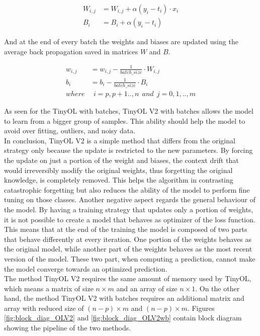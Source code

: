\documentclass[12pt]{report}
\begin{document}
\begin{align}
    W_{i,j} &= W_{i,j} + \alpha (y_i - t_i) \cdot x_i \\
    B_i     &= B_i + \alpha  (y_i - t_i) 
\end{align}

And at the end of every batch the weights and biases are updated using the average back propagation saved in matrices $W$ and $B$.

\begin{align}
    w_{i,j} &= w_{i,j} - \frac{1}{batch\_size} \cdot W_{i,j} \\
    b_i 	    &= b_i - \frac{1}{batch\_size} \cdot B_i \\
    where   & \: \: i= p,p+1..,n  \: \: and \: \:  j=0,1,..,m \nonumber  
\end{align}

As seen for the TinyOL with batches, TinyOL V2 with batches allows the model to learn from a bigger group of samples. This ability should help the model to avoid over fitting, outliers, and noisy data. \\
In conclusion, TinyOL V2 is a simple method that differs from the original strategy only because the update is restricted to the new parameters. By forcing the update on just a portion of the weight and biases, the context drift that would irreversibly modify the original weights, thus forgetting the original knowledge, is completely removed. This helps the algorithm in contrasting catastrophic forgetting but also reduces the ability of the model to perform fine tuning on those classes. Another negative aspect regards the general behaviour of the model. By having a training strategy that updates only a portion of weights, it is not possible to create a model that behaves as optimizer of the loss function. This means that at the end of the training the model is composed of two parts that behave differently at every iteration. One portion of the weights behaves as the original model, while another part of the weights behaves as the most recent version of the model. These two part, when computing a prediction, cannot make the model converge towards an optimized prediction. \\
The method TinyOL V2 requires the same amount of memory used by TinyOL, which means a matrix of size $n \times m$ and an array of size $n \times 1$. On the other hand, the method TinyOL V2 with batches requires an additional matrix and array with reduced size of $(n-p) \times m$ and $(n-p) \times m$. Figures \ref{fig:block_diag_OLV2} and \ref{fig:block_diag_OLV2wb} contain block diagram showing the pipeline of the two methods.
\end{document}
